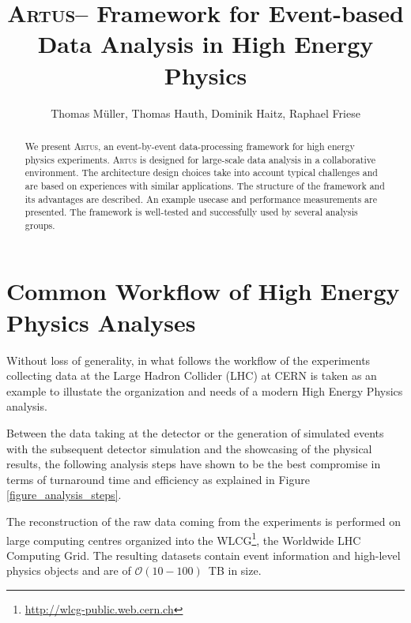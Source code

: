 \documentclass[3p]{elsarticle}
\newcommand{\software}[1]{\textsc{#1}\xspace}
\newcommand{\artus}{\software{Artus}}
\begin{document}
\begin{frontmatter}
\title{\artus -- Framework for Event-based Data Analysis in High Energy Physics}

\author[kit]{Thomas M\"uller, Thomas Hauth, Dominik Haitz, Raphael Friese}
\address[kit]{Karlsruhe Institute of Technology, Wolfgang-Gaede-Stra\ss{}e 1, D-76131 Karlsruhe}

\begin{abstract}
We present \artus, an event-by-event data-processing framework for high energy physics experiments.
\artus is designed for large-scale data analysis in a collaborative environment.
The architecture design choices take into account typical challenges and are based on experiences with similar applications.
The structure of the framework and its advantages are described.
An example usecase and performance measurements are presented.
The framework is well-tested and successfully used by several analysis groups.
\end{abstract}

\end{frontmatter}


\section{Common Workflow of High Energy Physics Analyses \label{section_artus_analysis_workflow}}
Without loss of generality, in what follows the workflow of the experiments collecting data at the Large Hadron Collider (LHC) at CERN is taken as an example to illustate the organization and needs of a modern High Energy Physics analysis.

Between the data taking at the detector or the generation of simulated events with the subsequent detector simulation and the showcasing of the physical results, the following analysis steps have shown to be the best compromise in terms of turnaround time and efficiency as explained in Figure \ref{figure_analysis_steps}.

The reconstruction of the raw data coming from the experiments is performed on large computing centres organized into the WLCG\footnote{\url{http://wlcg-public.web.cern.ch}}, the Worldwide LHC Computing Grid. The resulting datasets contain event information and high-level physics objects and are of $\mathcal O(10-100)$~TB in size. 
\end{document}
